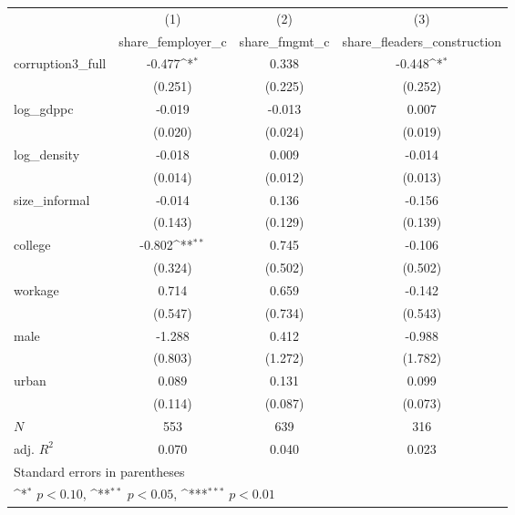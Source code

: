 {
\def\sym#1{\ifmmode^{#1}\else\(^{#1}\)\fi}
\begin{tabular}{l*{3}{c}}
\hline\hline
            &\multicolumn{1}{c}{(1)}&\multicolumn{1}{c}{(2)}&\multicolumn{1}{c}{(3)}\\
            &\multicolumn{1}{c}{share\_femployer\_c}&\multicolumn{1}{c}{share\_fmgmt\_c}&\multicolumn{1}{c}{share\_fleaders\_construction}\\
\hline
corruption3\_full&      -0.477\sym{*}  &       0.338         &      -0.448\sym{*}  \\
            &     (0.251)         &     (0.225)         &     (0.252)         \\
[1em]
log\_gdppc   &      -0.019         &      -0.013         &       0.007         \\
            &     (0.020)         &     (0.024)         &     (0.019)         \\
[1em]
log\_density &      -0.018         &       0.009         &      -0.014         \\
            &     (0.014)         &     (0.012)         &     (0.013)         \\
[1em]
size\_informal&      -0.014         &       0.136         &      -0.156         \\
            &     (0.143)         &     (0.129)         &     (0.139)         \\
[1em]
college     &      -0.802\sym{**} &       0.745         &      -0.106         \\
            &     (0.324)         &     (0.502)         &     (0.502)         \\
[1em]
workage     &       0.714         &       0.659         &      -0.142         \\
            &     (0.547)         &     (0.734)         &     (0.543)         \\
[1em]
male        &      -1.288         &       0.412         &      -0.988         \\
            &     (0.803)         &     (1.272)         &     (1.782)         \\
[1em]
urban       &       0.089         &       0.131         &       0.099         \\
            &     (0.114)         &     (0.087)         &     (0.073)         \\
\hline
\(N\)       &         553         &         639         &         316         \\
adj. \(R^{2}\)&       0.070         &       0.040         &       0.023         \\
\hline\hline
\multicolumn{4}{l}{\footnotesize Standard errors in parentheses}\\
\multicolumn{4}{l}{\footnotesize \sym{*} \(p<0.10\), \sym{**} \(p<0.05\), \sym{***} \(p<0.01\)}\\
\end{tabular}
}
